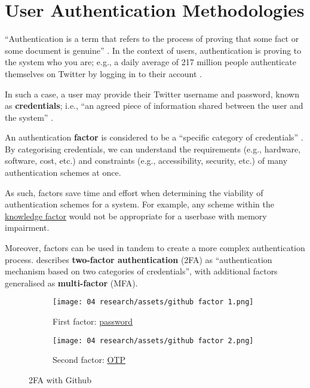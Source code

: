 \section{User Authentication Methodologies}

\enquote{Authentication is a term that refers to the
  process of proving that some fact or some document is
  genuine} \parencite{whatIsAuth}.
In the context of users, authentication is proving to the
system who you are; e.g., a daily average of 217 million
people authenticate themselves on Twitter by logging in to
their account \parencite[][Q4]{twitterUsage}.

In such a case, a user may provide their Twitter username
and password, known as \textbf{credentials}; i.e.,
\enquote{an agreed piece of information shared between the
  user and the system} \parencite{whatIsAuth}.

An authentication \textbf{factor} is considered to be a
\enquote{specific category of credentials}
\parencite{whatIsAuth}.
By categorising credentials, we can understand the
requirements (e.g., hardware, software, cost, etc.) and
constraints (e.g., accessibility, security, etc.) of many
authentication schemes at once.

As such, factors save time and effort when determining the
viability of authentication schemes for a system.
For example, any scheme within the
\hyperref[p:knowledge]{knowledge factor} would not be
appropriate for a userbase with memory impairment.

Moreover, factors can be used in tandem to create a more
complex authentication process.
\cite{whatIsAuth}
describes \textbf{two-factor authentication} (2FA) as
\enquote{authentication mechanism based on two categories
  of credentials}, with additional factors generalised as
\textbf{multi-factor} (MFA).

\begin{figure}[H]
  \centering
  \begin{subfigure}{0.49\linewidth}
    \centering
    \texttt{[image: 04
      research/assets/github factor 1.png]}
    \caption{First factor:
      \hyperref[p:passwords]{password}}
  \end{subfigure}
  \begin{subfigure}{0.49\linewidth}
    \centering
    \texttt{[image: 04
      research/assets/github factor 2.png]}
    \caption{Second factor:
      \hyperref[p:otp]{OTP}}

  \end{subfigure}

  \caption{2FA with Github}
\end{figure}

